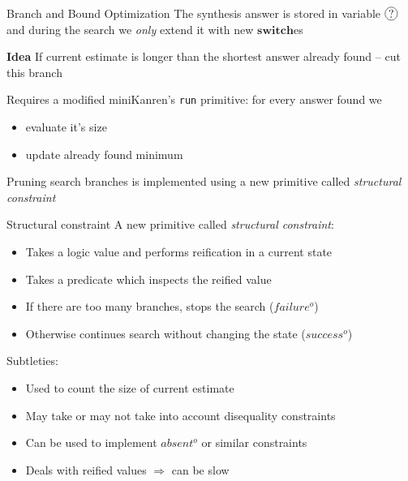 \documentclass[aspectratio=169
  , xcolor={svgnames}
  , hyperref={ colorlinks,citecolor=Blue
             , linkcolor=DarkRed,urlcolor=DarkBlue}
  , russian
  ]{beamer}
\newcommand{\primi}[1]{\mathbf{#1}}
\newcommand*\circled[1]{\tikz[baseline=(char.base)]{
    \node[shape=circle,draw,inner sep=1pt] (char) {#1};}}
\begin{document}
\begin{frame}{Branch and Bound Optimization}
The synthesis answer is stored in variable $\circled{?}$ and 
during the search we \emph{only} extend it with new $\primi{switch}$es \\

\begin{alertblock}{\textbf{Idea}}
If current estimate is longer than the shortest answer already found -- cut this branch
\end{alertblock}

Requires a modified miniKanren's \lstinline=run= primitive: for every answer found we 
\begin{itemize}
\item evaluate it's size
\item update already found minimum
\end{itemize}

Pruning search branches is implemented using a new primitive called  \emph{structural constraint}

\end{frame}

\begin{frame}{Structural constraint}
A new primitive called \emph{structural constraint}:
\begin{itemize}
\item Takes a logic value and performs reification in a current state
\item Takes a predicate which inspects the reified value 
\item If there are too many branches, stops the search ($failure^o$)
\item Otherwise continues search without changing the state ($success^o$)
\end{itemize}
\vspace{1em}
Subtleties:
\begin{itemize}
\item Used to count the size of current estimate
\item May take or may not take into account disequality constraints
\item Can be used to implement $absent^o$ or similar constraints
\item Deals with reified values $\Rightarrow$ can be slow
\end{itemize}
\end{frame}
\end{document}

